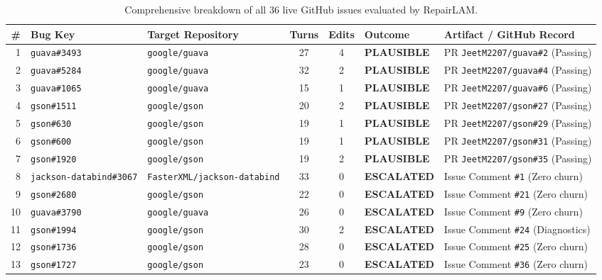 \documentclass[12pt,a4paper]{report}
\begin{document}
\begin{table}[htbp]
\centering
\tiny
\caption{Comprehensive breakdown of all 36 live GitHub issues evaluated by RepairLAM.}
\label{tab:full_36_breakdown}
\begin{tabularx}{\textwidth}{r l l c c l X}
\toprule
\textbf{\#} & \textbf{Bug Key} & \textbf{Target Repository} & \textbf{Turns} & \textbf{Edits} & \textbf{Outcome} & \textbf{Artifact / GitHub Record} \\
\midrule
1 & \texttt{guava\#3493} & \texttt{google/guava} & 27 & 4 & \textbf{PLAUSIBLE} & PR \texttt{JeetM2207/guava\#2} (Passing) \\
2 & \texttt{guava\#5284} & \texttt{google/guava} & 32 & 2 & \textbf{PLAUSIBLE} & PR \texttt{JeetM2207/guava\#4} (Passing) \\
3 & \texttt{guava\#1065} & \texttt{google/guava} & 15 & 1 & \textbf{PLAUSIBLE} & PR \texttt{JeetM2207/guava\#6} (Passing) \\
4 & \texttt{gson\#1511} & \texttt{google/gson} & 20 & 2 & \textbf{PLAUSIBLE} & PR \texttt{JeetM2207/gson\#27} (Passing) \\
5 & \texttt{gson\#630} & \texttt{google/gson} & 19 & 1 & \textbf{PLAUSIBLE} & PR \texttt{JeetM2207/gson\#29} (Passing) \\
6 & \texttt{gson\#600} & \texttt{google/gson} & 19 & 1 & \textbf{PLAUSIBLE} & PR \texttt{JeetM2207/gson\#31} (Passing) \\
7 & \texttt{gson\#1920} & \texttt{google/gson} & 19 & 2 & \textbf{PLAUSIBLE} & PR \texttt{JeetM2207/gson\#35} (Passing) \\
\midrule
8 & \texttt{jackson-databind\#3067} & \texttt{FasterXML/jackson-databind} & 33 & 0 & \textbf{ESCALATED} & Issue Comment \texttt{\#1} (Zero churn) \\
9 & \texttt{gson\#2680} & \texttt{google/gson} & 22 & 0 & \textbf{ESCALATED} & Issue Comment \texttt{\#21} (Zero churn) \\
10 & \texttt{guava\#3790} & \texttt{google/guava} & 26 & 0 & \textbf{ESCALATED} & Issue Comment \texttt{\#9} (Zero churn) \\
11 & \texttt{gson\#1994} & \texttt{google/gson} & 30 & 2 & \textbf{ESCALATED} & Issue Comment \texttt{\#24} (Diagnostics) \\
12 & \texttt{gson\#1736} & \texttt{google/gson} & 28 & 0 & \textbf{ESCALATED} & Issue Comment \texttt{\#25} (Zero churn) \\
13 & \texttt{gson\#1727} & \texttt{google/gson} & 23 & 0 & \textbf{ESCALATED} & Issue Comment \texttt{\#36} (Zero churn) \\

\end{tabularx}
\end{table}
\end{document}
